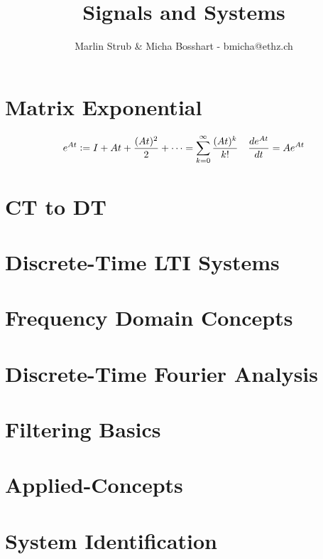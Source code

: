 \documentclass{mpscheatsheet}
\author{Marlin Strub \& Micha Bosshart - bmicha@ethz.ch}
\title{Signals and Systems}
\begin{document}
    \section{Matrix Exponential}
        \vspace{-1em}
        \begin{align*}
            e^{At} &\vcentcolon= I + At + \frac{(At)^2}{2} + \cdots = \sum_{k=0}^\infty \frac{(At)^k}{k!} & \frac{d e^{At}}{dt} = Ae^{At}
        \end{align*}
    \section{CT to DT}
        
    \section{Discrete-Time LTI Systems}
        
        
    \section{Frequency Domain Concepts}
        
        
    \section{Discrete-Time Fourier Analysis}
        
        
        
        
    
    \section{Filtering Basics}
        
        
        
    \section{Applied-Concepts}
        
    \section{System Identification}
        
        
        
        
\end{document}
